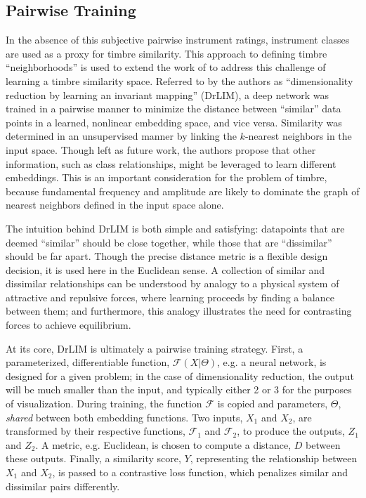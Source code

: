 \subsection{Pairwise Training}
\label{subsec:timbre_pairwise}

In the absence of this subjective pairwise instrument ratings, instrument classes are used as a proxy for timbre similarity.
This approach to defining timbre ``neighborhoods'' is used to extend the work of \cite{Hadsell2006Dimensionality} to address this challenge of learning a timbre similarity space.
Referred to by the authors as ``dimensionality reduction by learning an invariant mapping'' (DrLIM), a deep network was trained in a pairwise manner to minimize the distance between ``similar'' data points in a learned, nonlinear embedding space, and vice versa.
Similarity was determined in an unsupervised manner by linking the $k$-nearest neighbors in the input space.
Though left as future work, the authors propose that other information, such as class relationships, might be leveraged to learn different embeddings.
This is an important consideration for the problem of timbre, because fundamental frequency and amplitude are likely to dominate the graph of nearest neighbors defined in the input space alone.

The intuition behind DrLIM is both simple and satisfying: datapoints that are deemed ``similar'' should be close together, while those that are ``dissimilar'' should be far apart.
Though the precise distance metric is a flexible design decision, it is used here in the Euclidean sense.
A collection of similar and dissimilar relationships can be understood by analogy to a physical system of attractive and repulsive forces, where learning proceeds by finding a balance between them; and furthermore, this analogy illustrates the need for contrasting forces to achieve equilibrium.

At its core, DrLIM is ultimately a pairwise training strategy.
First, a parameterized, differentiable function, $\mathcal{F}(X | \Theta)$, e.g. a neural network, is designed for a given problem;
in the case of dimensionality reduction, the output will be much smaller than the input, and typically either 2 or 3 for the purposes of visualization.
During training, the function $\mathcal{F}$ is copied and parameters, $\Theta$, \emph{shared} between both embedding functions.
Two inputs, $X_1$ and $X_2$, are transformed by their respective functions, $\mathcal{F}_1$ and $\mathcal{F}_2$, to produce the outputs, $Z_1$ and $Z_2$.
A metric, e.g. Euclidean, is chosen to compute a distance, $D$ between these outputs.
Finally, a similarity score, $Y$, representing the relationship between $X_1$ and $X_2$, is passed to a contrastive loss function, which penalizes similar and dissimilar pairs differently.

